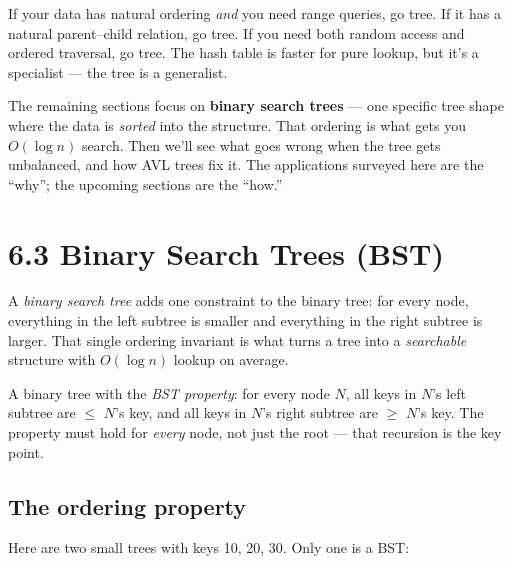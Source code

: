 \documentclass[11pt]{article}
\begin{document}
\begin{notebox}
If your data has natural ordering \emph{and} you need range
queries, go tree. If it has a natural parent--child relation, go
tree. If you need both random access and ordered traversal, go
tree. The hash table is faster for pure lookup, but it's a
specialist --- the tree is a generalist.
\end{notebox}

\begin{ideabox}
The remaining sections focus on \textbf{binary search trees}
--- one specific tree shape where the data is \emph{sorted} into
the structure. That ordering is what gets you $O(\log n)$
search. Then we'll see what goes wrong when the tree gets
unbalanced, and how AVL trees fix it. The applications surveyed
here are the ``why''; the upcoming sections are the ``how.''
\end{ideabox}

\section{6.3 Binary Search Trees (BST)}

A \emph{binary search tree} adds one constraint to the binary
tree: for every node, everything in the left subtree is smaller
and everything in the right subtree is larger. That single
ordering invariant is what turns a tree into a \emph{searchable}
structure with $O(\log n)$ lookup on average.

\begin{defnbox}
A binary tree with the \emph{BST property}: for every node $N$,
all keys in $N$'s left subtree are $\leq$ $N$'s key, and all
keys in $N$'s right subtree are $\geq$ $N$'s key. The property
must hold for \emph{every} node, not just the root --- that
recursion is the key point.
\end{defnbox}

\subsection*{The ordering property}

Here are two small trees with keys 10, 20, 30. Only one is a BST:
\end{document}
